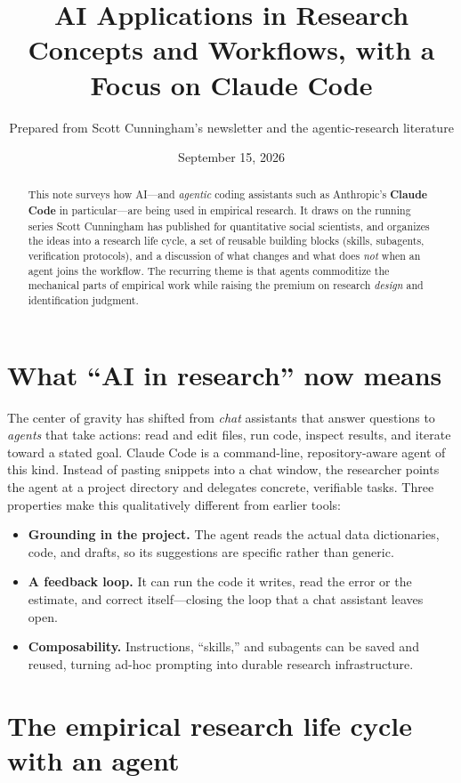 \documentclass[11pt]{article}
\title{\textbf{AI Applications in Research}\\[2pt]
\large Concepts and Workflows, with a Focus on Claude Code}
\author{Prepared from Scott Cunningham's newsletter and the agentic-research literature}
\date{September 15, 2026}
\begin{document}
\maketitle

\begin{abstract}
\noindent This note surveys how AI---and \emph{agentic} coding assistants such
as Anthropic's \textbf{Claude Code} in particular---are being used in
empirical research. It draws on the running series Scott Cunningham has
published for quantitative social scientists, and organizes the ideas into a
research life cycle, a set of reusable building blocks (skills, subagents,
verification protocols), and a discussion of what changes and what does
\emph{not} when an agent joins the workflow. The recurring theme is that
agents commoditize the mechanical parts of empirical work while raising the
premium on research \emph{design} and identification judgment.
\end{abstract}

\section{What ``AI in research'' now means}

The center of gravity has shifted from \emph{chat} assistants that answer
questions to \emph{agents} that take actions: read and edit files, run code,
inspect results, and iterate toward a stated goal. Claude Code is a
command-line, repository-aware agent of this kind. Instead of pasting
snippets into a chat window, the researcher points the agent at a project
directory and delegates concrete, verifiable tasks. Three properties make
this qualitatively different from earlier tools:

\begin{itemize}
  \item \textbf{Grounding in the project.} The agent reads the actual data
    dictionaries, code, and drafts, so its suggestions are specific rather
    than generic.
  \item \textbf{A feedback loop.} It can run the code it writes, read the
    error or the estimate, and correct itself---closing the loop that a chat
    assistant leaves open.
  \item \textbf{Composability.} Instructions, ``skills,'' and subagents can be
    saved and reused, turning ad-hoc prompting into durable research
    infrastructure.
\end{itemize}

\section{The empirical research life cycle with an agent}
\end{document}
